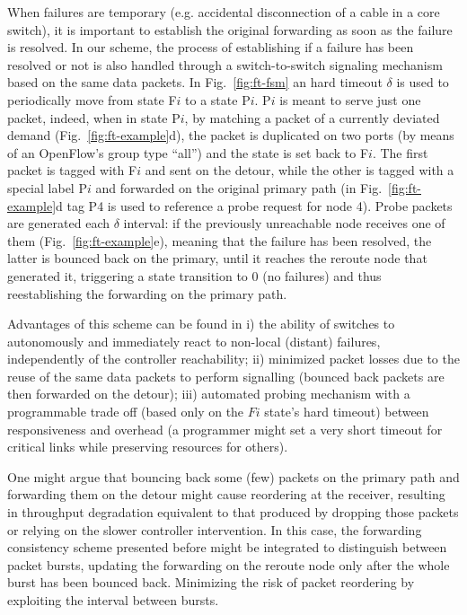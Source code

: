 \documentclass[10pt,conference]{IEEEtran}
\begin{document}
When failures are temporary (e.g. accidental disconnection of a cable in a core switch), it is important to establish the original forwarding as soon as the failure is resolved. In our scheme, the process of establishing if a failure has been resolved or not is also handled through a switch-to-switch signaling mechanism based on the same data packets. In Fig.~\ref{fig:ft-fsm} an hard timeout $\delta$ is used to periodically move from state F$i$ to a state P$i$. P$i$ is meant to serve just one packet, indeed, when in state P$i$, by matching a packet of a currently deviated demand (Fig.~\ref{fig:ft-example}d), the packet is duplicated on two ports (by means of an OpenFlow's group type ``all'') and the state is set back to F$i$. The first packet is tagged with F$i$ and sent on the detour, while the other is tagged with a special label P$i$ and forwarded on the original primary path (in Fig.~\ref{fig:ft-example}d tag P4 is used to reference a probe request for node 4). Probe packets are generated each $\delta$ interval: if the previously unreachable node receives one of them (Fig.~\ref{fig:ft-example}e), meaning that the failure has been resolved, the latter is bounced back on the primary, until it reaches the reroute node that generated it, triggering a state transition to 0 (no failures) and thus reestablishing the forwarding on the primary path.

Advantages of this scheme can be found in i) the ability of switches to autonomously and immediately react to non-local (distant) failures, independently of the controller reachability; ii) minimized packet losses due to the reuse of the same data packets to perform signalling (bounced back packets are then forwarded on the detour); iii) automated probing mechanism with a programmable trade off (based only on the $Fi$ state's hard timeout) between responsiveness and overhead (a programmer might set a very short timeout for critical links while preserving resources for others).

One might argue that bouncing back some (few) packets on the primary path and forwarding them on the detour might cause reordering at the receiver, resulting in throughput degradation equivalent to that produced by dropping those packets or relying on the slower controller intervention. In this case, the forwarding consistency scheme presented before might be integrated to distinguish between packet bursts, updating the forwarding on the reroute node only after the whole burst has been bounced back. Minimizing the risk of packet reordering by exploiting the interval between bursts.
\end{document}
